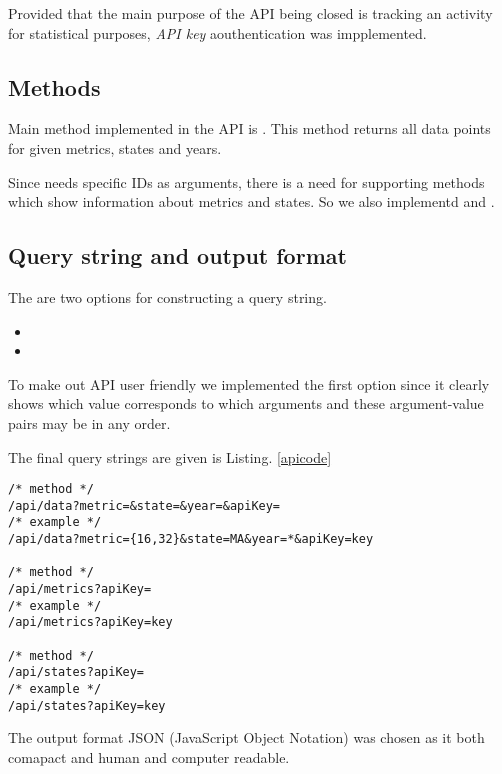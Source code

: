 			Provided that the main purpose of the API being closed is tracking an activity for statistical purposes, \emph{API key} aouthentication was impplemented.

		\subsection{Methods}
			
			Main method implemented in the API is . This method returns all data points for given metrics, states and years.
			
			Since  needs specific IDs as arguments, there is a need for supporting methods which show information about metrics and states. So we also implementd  and .

		\subsection{Query string and output format}
		
			The are two options for constructing a query string.
			\begin{itemize}
				\item
				\item
			\end{itemize}
			
			To make out API user friendly we implemented the first option since it clearly shows which value corresponds to which arguments and these argument-value pairs may be in any order.
			
			The final query strings are given is Listing. \ref{apicode}
			
			\begin{lstlisting}[frame=lines, caption={API methods examples}, label=apicode, backgroundcolor=\color{codegray}, emph={data,metrics, states},emphstyle=\underbar]
/* method */
/api/data?metric=&state=&year=&apiKey=
/* example */
/api/data?metric={16,32}&state=MA&year=*&apiKey=key

/* method */
/api/metrics?apiKey=
/* example */
/api/metrics?apiKey=key

/* method */
/api/states?apiKey=
/* example */
/api/states?apiKey=key
			\end{lstlisting}
			
			The output format JSON (JavaScript Object Notation) was chosen as it both comapact and human and computer readable. 
			
